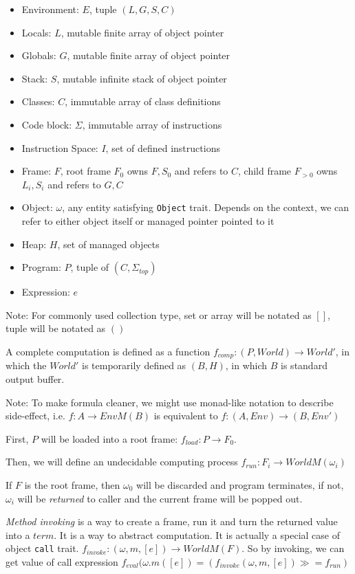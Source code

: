 \documentclass[]{article}
\numberwithin{equation}{section}
\numberwithin{figure}{section}
\numberwithin{table}{section}
\begin{document}
\begin{itemize}
\itemsep1pt\parskip0pt
\item
  Environment: $E$, tuple $(L, G, S, C)$
\item
  Locals: $L$, mutable finite array of object pointer
\item
  Globals: $G$, mutable finite array of object pointer
\item
  Stack: $S$, mutable infinite stack of object pointer
\item
  Classes: $C$, immutable array of class definitions
\item
  Code block: $\Sigma$, immutable array of instructions
\item
  Instruction Space: $I$, set of defined instructions
\item
  Frame: $F$, root frame $F_0$ owns $F, S_0$ and refers to $C$, child frame $F_{>0}$ owns $L_i, S_i$ and refers to $G, C$
\item
  Object: $\omega$, any entity satisfying \texttt{Object} trait. Depends on the context, we can refer to either object itself or managed pointer pointed to it
\item
  Heap: $H$, set of managed objects
\item
  Program: $P$, tuple of $(C, \Sigma_{top})$
\item
  Expression: $e$
\end{itemize}

Note: For commonly used collection type, set or array will be notated as $[]$, tuple will be notated as $()$

A complete computation is defined as a function
$f_{comp}: (P, World) \rightarrow World'$, in which the $World'$ is
temporarily defined as $(B, H)$, in which $B$ is standard output buffer.

Note: To make formula cleaner, we might use monad-like notation to
describe side-effect, i.e. $f: A \rightarrow EnvM(B)$ is equivalent to
$f: (A, Env) \rightarrow (B, Env')$

First, $P$ will be loaded into a root frame:
$f_{load}: P \rightarrow F_0$.

Then, we will define an undecidable computing process
$f_{run}: F_i \rightarrow WorldM(\omega_{i})$

If $F$ is the root frame, then $\omega_0$ will be discarded and program
terminates, if not, $\omega_i$ will be \emph{returned} to caller and the
current frame will be popped out.

\emph{Method invoking} is a way to create a frame, run it and turn the
returned value into a $term$. It is a way to abstract computation. It is
actually a special case of object \texttt{call} trait.
$f_{invoke}: (\omega, m, [e]) \rightarrow WorldM(F)$. So by invoking, we can get
value of call expression
$f_{eval}{(\omega.m([e])} = (f_{invoke}(\omega, m, [e]) \gg = f_{run})$
\end{document}

